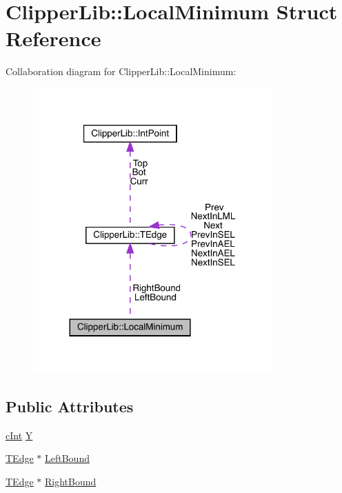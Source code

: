 \hypertarget{struct_clipper_lib_1_1_local_minimum}{}\section{Clipper\+Lib\+::Local\+Minimum Struct Reference}
\label{struct_clipper_lib_1_1_local_minimum}


Collaboration diagram for Clipper\+Lib\+::Local\+Minimum\+:
\nopagebreak
\begin{figure}[H]
\begin{center}
\leavevmode
\includegraphics[width=260pt]{struct_clipper_lib_1_1_local_minimum__coll__graph}
\end{center}
\end{figure}
\subsection*{Public Attributes}
\begin{DoxyCompactItemize}
\item 
\mbox{\hyperlink{namespace_clipper_lib_a7156730a24951629192d4831334bafaa}{c\+Int}} \mbox{\hyperlink{struct_clipper_lib_1_1_local_minimum_a71836a7c572ddfcf8853accb7314b7cf}{Y}}
\item 
\mbox{\hyperlink{struct_clipper_lib_1_1_t_edge}{T\+Edge}} $\ast$ \mbox{\hyperlink{struct_clipper_lib_1_1_local_minimum_a0e7b997adca472b6e80f3223c45965ea}{Left\+Bound}}
\item 
\mbox{\hyperlink{struct_clipper_lib_1_1_t_edge}{T\+Edge}} $\ast$ \mbox{\hyperlink{struct_clipper_lib_1_1_local_minimum_ade212cfb8c35da168b2bf20ad3e0ac94}{Right\+Bound}}
\end{DoxyCompactItemize}


